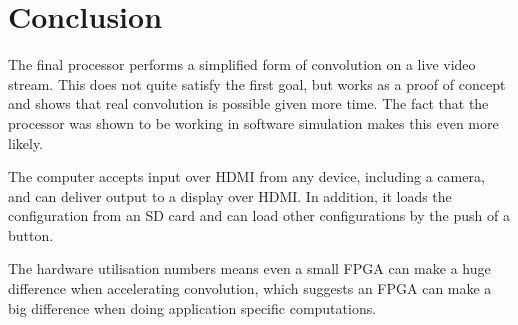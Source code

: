 \section{Conclusion}
The final processor performs a simplified form of convolution on a live video stream.
This does not quite satisfy the first goal,
but works as a proof of concept and shows that real convolution is possible given more time.
The fact that the processor was shown to be working in software simulation makes this even more likely.

The computer accepts input over HDMI from any device, including a camera, and can deliver output to a display over HDMI.
In addition,
it loads the configuration from an SD card and can load other configurations by the push of a button.

The hardware utilisation numbers means even a small FPGA can make a huge difference when accelerating convolution,
which suggests an FPGA can make a big difference when doing application specific computations.
